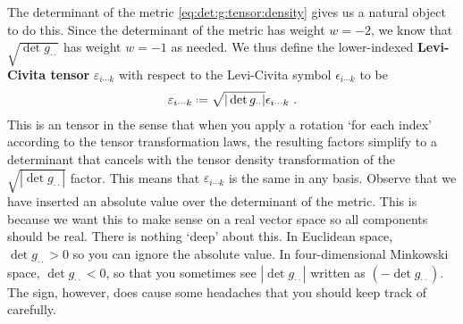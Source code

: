\begin{subappendices}
The determinant of the metric \eqref{eq:det:g:tensor:density} gives us a natural object to do this. Since the determinant of the metric has weight $w=-2$, we know that $\sqrt{\det g_{\cdot\cdot}}$ has weight $w=-1$ as needed. We thus define the lower-indexed \textbf{Levi-Civita tensor} $\varepsilon_{i\cdots k}$ with respect to the Levi-Civita symbol $\epsilon_{i\cdots k}$ to be
\begin{align}
    \varepsilon_{i\cdots k} \defeq \sqrt{|\det g_{\cdot\cdot}|} \epsilon_{i\cdots k} \ .
    \label{eq:Levi:Civita:tensor:definition}
\end{align}
This is an tensor in the sense that when you apply a rotation `for each index' according to the tensor transformation laws, the resulting factors simplify to a determinant that cancels with the tensor density transformation of the $\sqrt{|\det g_{\cdot\cdot}|} $ factor. This means that $\varepsilon_{i\cdots k}$ is the same in any basis.
Observe that we have inserted an absolute value over the determinant of the metric. This is because we want this to make sense on a real vector space so all components should be real. There is nothing `deep' about this. In Euclidean space, $\det g_{\cdot\cdot} > 0$ so you can ignore the absolute value. In four-dimensional Minkowski space, $\det g_{\cdot\cdot} < 0$, so that you sometimes see $|\det g_{\cdot\cdot}|$ written as $(-\det g_{\cdot\cdot})$. The sign, however, does cause some headaches that you should keep track of carefully.



\end{subappendices}
